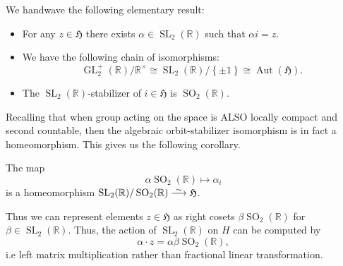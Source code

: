 \documentclass[11pt, x11names, openany]{book}
\newcommand{\rr}{\mathbb{R}}
\newcommand{\frakh}{\mathfrak{H}}
\newcommand{\bij}{\stackrel{\sim}{\smash{\longrightarrow}\rule{0pt}{0.5ex}}}
\newcommand{\set}[1]{\left\{ #1 \right\}}
\DeclareMathOperator{\aut}{Aut}
\DeclareMathOperator{\GL}{GL}
\DeclareMathOperator{\SL}{SL}
\DeclareMathOperator{\SO}{SO}
\begin{document}
We handwave the following elementary result:

\begin{theorem}
    \label{thm: Upper-HalfPlane Automorphisms}
    \begin{itemize}[(a)]
        \item For any $z \in \frakh$ there exists $\alpha \in \SL_2(\rr)$ such that $\alpha i = z$.
        \item We have the following chain of isomorphisms:
        \begin{equation*}
            \GL_2^+(\rr)/\rr^\times \cong \SL_2(\rr) / \set{ \pm 1} \cong \aut(\frakh).
        \end{equation*}
        \item The $\SL_2(\rr)$-stabilizer of $i \in \frakh$ is $\SO_2(\rr)$.
    \end{itemize}
\end{theorem}

Recalling that when group acting on the space is ALSO locally compact and second countable, then the algebraic orbit-stabilizer isomorphism is in fact a homeomorphism. This gives us the following corollary.
\begin{corollary}
    The map
    \begin{equation*}
        \alpha \SO_2(\rr) \mapsto \alpha_i
    \end{equation*}
    is a homeomorphism $\SL_2(\rr)/\SO_2(\rr) \bij \frakh$.
\end{corollary}

Thus we can represent elements $z \in \frakh$ as right cosets $\beta \SO_2(\rr)$ for $\beta \in \SL_2(\rr)$. Thus, the action of $\SL_2(\rr)$ on $H$ can be computed by
\begin{equation*}
    \alpha \cdot z = \alpha \beta \SO_2(\rr),
\end{equation*}
i.e left matrix multiplication rather than fractional linear transformation.




\renewcommand{\bibname}{References}
\printbibliography
\end{document}
